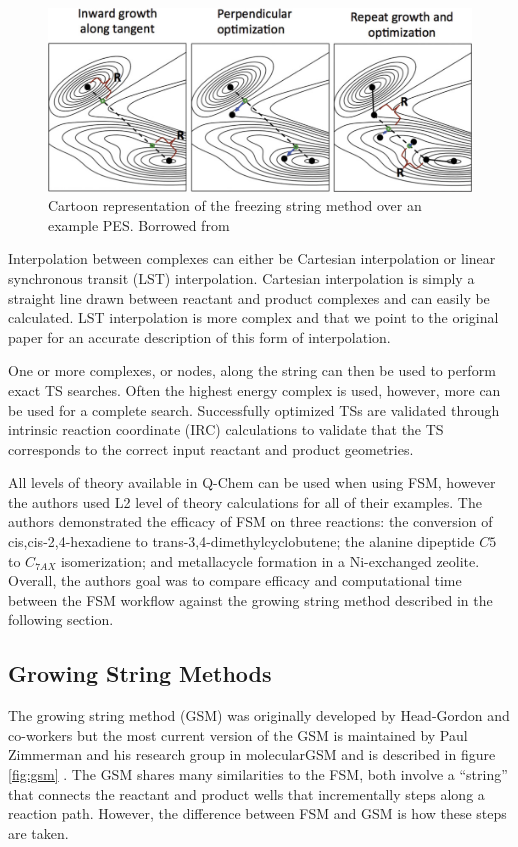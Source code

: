 \documentclass[preprint, 11pt]{elsarticle} %
\begin{document}
\begin{figure}
    \centering
    \includegraphics[width=5in]{fsm}
    \caption{Cartoon representation of the freezing string method over an example PES. Borrowed from \cite{Behn:2011}}
    \label{fig:fsm}
\end{figure}

Interpolation between complexes can either be Cartesian interpolation or linear synchronous transit (LST) interpolation. 
Cartesian interpolation is simply a straight line drawn between reactant and product complexes and can easily be calculated.
LST interpolation is more complex and that we point to the original paper for an accurate description of this form of interpolation. 

One or more complexes, or nodes, along the string can then be used to perform exact TS searches.
Often the highest energy complex is used, however, more can be used for a complete search. 
Successfully optimized TSs are validated through intrinsic reaction coordinate (IRC) calculations to validate that the TS corresponds to the correct input reactant and product geometries. 

All levels of theory available in Q-Chem \cite{QChem:2015} can be used when using FSM, however the authors used L2 level of theory calculations for all of their examples.
The authors demonstrated the efficacy of FSM on three reactions: the conversion of cis,cis-2,4-hexadiene to trans-3,4-dimethylcyclobutene; the alanine dipeptide $C5$ to $C_{7AX}$ isomerization; and metallacycle formation in a Ni-exchanged zeolite.
Overall, the authors goal was to compare efficacy and computational time between the FSM workflow against the growing string method described in the following section.

\subsection{Growing String Methods}

The growing string method (GSM) was originally developed by Head-Gordon and co-workers \cite{Behn:2011jc} but the most current version of the GSM is maintained by Paul Zimmerman and his research group in molecularGSM \cite{Zimmerman:2013jctc, Zimmerman:2015jcc} and is described in figure \ref{fig:gsm} .
The GSM shares many similarities to the FSM, both involve a ``string'' that connects the reactant and product wells that incrementally steps along a reaction path.
However, the difference between FSM and GSM is how these steps are taken. 
\end{document}
